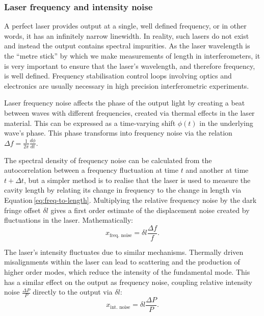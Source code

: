 \subsubsection{\label{sec:laser-noise}Laser frequency and intensity noise}
A perfect laser provides output at a single, well defined frequency, or in other words, it has an infinitely narrow linewidth. In reality, such lasers do not exist and instead the output contains spectral impurities. As the laser wavelength is the ``metre stick'' by which we make measurements of length in interferometers, it is very important to ensure that the laser's wavelength, and therefore frequency, is well defined. Frequency stabilisation control loops involving optics and electronics are usually necessary in high precision interferometric experiments.

Laser frequency noise affects the phase of the output light by creating a beat between waves with different frequencies, created via thermal effects in the laser material. This can be expressed as a time-varying shift $\phi \left( t \right)$ in the underlying wave's phase. This phase transforms into frequency noise via the relation $\Delta f = \frac{1}{2 \pi} \frac{d \phi}{dt}$.

The spectral density of frequency noise can be calculated from the autocorrelation between a frequency fluctuation at time $t$ and another at time $t + \Delta t$, but a simpler method is to realise that the laser is used to measure the cavity length by relating its change in frequency to the change in length via Equation\,\ref{eq:freq-to-length}. Multiplying the relative frequency noise by the dark fringe offset $\delta l$  gives a first order estimate of the displacement noise created by fluctuations in the laser. Mathematically:
\begin{equation}
  \label{eq:laser-freq-noise}
  x_{\text{freq. noise}} = \delta l \frac{\Delta f}{f}.
\end{equation}

The laser's intensity fluctuates due to similar mechanisms. Thermally driven misalignments within the laser can lead to scattering and the production of higher order modes, which reduce the intensity of the fundamental mode. This has a similar effect on the output as frequency noise, coupling relative intensity noise $\frac{\Delta P}{P}$ directly to the output via $\delta l$:
\begin{equation}
  \label{eq:laser-int-noise}
  x_{\text{int. noise}} = \delta l \frac{\Delta P}{P}.
\end{equation}

